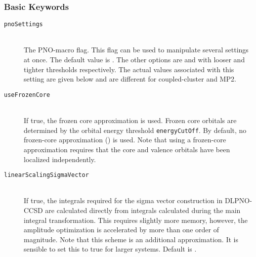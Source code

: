 \subsubsection{Basic Keywords}
\begin{description}
  \item [\texttt{pnoSettings}]\hfill \\
  The PNO-macro flag. This flag can be used to manipulate several settings at once. The default value is
  . The other options are  and  with looser and tighter thresholds
  respectively. The actual values associated with this setting are given below and are different for
  coupled-cluster and MP2.
 \item [\texttt{useFrozenCore}]\hfill \\
 If true, the frozen core approximation is used. Frozen core orbitals are determined by the orbital energy
 threshold \texttt{energyCutOff}. By default, no frozen-core approximation () is used. Note
 that using a frozen-core approximation requires that the core and valence orbitals have been localized
 independently.
 \item [\texttt{linearScalingSigmaVector}]\hfill \\
 If true, the integrals required for the sigma vector construction in DLPNO-CCSD are calculated directly from
 integrals calculated during the main integral transformation. This requires slightly more memory, however,
 the amplitude optimization is accelerated by more than one order of magnitude. Note that this scheme is an
 additional approximation. It is sensible to set this to true for larger systems. Default is .
\end{description}
